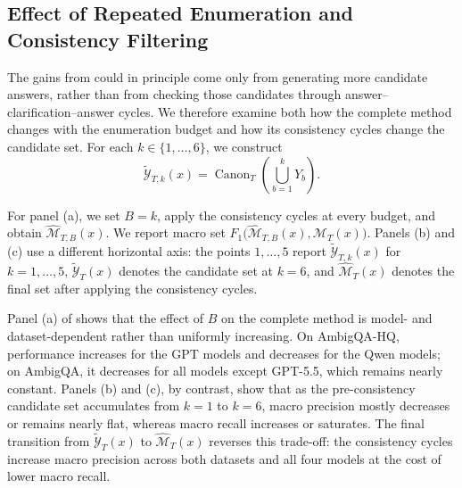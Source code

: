 \begin{table}[t]
    \centering
    \caption{Macro precision and recall (\%) corresponding to the set-$F_1$ results in . Each cell reports $P/R$; recall is one when the reference support is empty. Green and orange mark the best and second-best method, respectively.}
    \label{tab:full-precision-recall}
    \vspace{3pt}
    \setlength{\tabcolsep}{2pt}
    \resizebox{\columnwidth}{!}{%
    }

\end{table}

\subsection{Effect of Repeated Enumeration and Consistency Filtering}
\label{app:consistency-check}

The gains from \circleclar{} could in principle come only from generating more candidate answers, rather than from checking those candidates through answer--clarification--answer cycles. We therefore examine both how the complete method changes with the enumeration budget and how its consistency cycles change the candidate set. For each \(k\in\{1,\ldots,6\}\), we construct
\[
    \widetilde{\mathcal{Y}}_{T,k}(x)
    =
    \operatorname{Canon}_T\!\left(\bigcup_{b=1}^{k}Y_b\right).
\]

For panel (a), we set \(B=k\), apply the consistency cycles at every budget, and obtain \(\widehat{\mathcal{M}}_{T,B}(x)\). We report macro set \(F_1\bigl(\widehat{\mathcal{M}}_{T,B}(x),\mathcal{M}_T(x)\bigr)\). Panels (b) and (c) use a different horizontal axis: the points \(1,\ldots,5\) report \(\widetilde{\mathcal{Y}}_{T,k}(x)\) for \(k=1,\ldots,5\), \(\widetilde{\mathcal{Y}}_T(x)\) denotes the candidate set at \(k=6\), and \(\widehat{\mathcal{M}}_T(x)\) denotes the final set after applying the consistency cycles.



Panel (a) of  shows that the effect of \(B\) on the complete method is model- and dataset-dependent rather than uniformly increasing. On AmbigQA-HQ, performance increases for the GPT models and decreases for the Qwen models; on AmbigQA, it decreases for all models except GPT-5.5, which remains nearly constant. Panels (b) and (c), by contrast, show that as the pre-consistency candidate set accumulates from \(k=1\) to \(k=6\), macro precision mostly decreases or remains nearly flat, whereas macro recall increases or saturates. The final transition from \(\widetilde{\mathcal{Y}}_T(x)\) to \(\widehat{\mathcal{M}}_T(x)\) reverses this trade-off: the consistency cycles increase macro precision across both datasets and all four models at the cost of lower macro recall.

